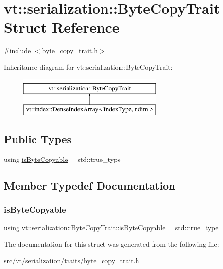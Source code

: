 \hypertarget{structvt_1_1serialization_1_1_byte_copy_trait}{}\section{vt\+:\+:serialization\+:\+:Byte\+Copy\+Trait Struct Reference}
\label{structvt_1_1serialization_1_1_byte_copy_trait}


{\ttfamily \#include $<$byte\+\_\+copy\+\_\+trait.\+h$>$}

Inheritance diagram for vt\+:\+:serialization\+:\+:Byte\+Copy\+Trait\+:\begin{figure}[H]
\begin{center}
\leavevmode
\includegraphics[height=2.000000cm]{structvt_1_1serialization_1_1_byte_copy_trait}
\end{center}
\end{figure}
\subsection*{Public Types}
\begin{DoxyCompactItemize}
\item 
using \hyperlink{structvt_1_1serialization_1_1_byte_copy_trait_a9f2c1bdf8bb5401b693861dc79d4ca38}{is\+Byte\+Copyable} = std\+::true\+\_\+type
\end{DoxyCompactItemize}


\subsection{Member Typedef Documentation}
\mbox{\label{structvt_1_1serialization_1_1_byte_copy_trait_a9f2c1bdf8bb5401b693861dc79d4ca38}} 
\subsubsection{\texorpdfstring{is\+Byte\+Copyable}{isByteCopyable}}
{\footnotesize\ttfamily using \hyperlink{structvt_1_1serialization_1_1_byte_copy_trait_a9f2c1bdf8bb5401b693861dc79d4ca38}{vt\+::serialization\+::\+Byte\+Copy\+Trait\+::is\+Byte\+Copyable} =  std\+::true\+\_\+type}



The documentation for this struct was generated from the following file\+:\begin{DoxyCompactItemize}
\item 
src/vt/serialization/traits/\hyperlink{byte__copy__trait_8h}{byte\+\_\+copy\+\_\+trait.\+h}\end{DoxyCompactItemize}
